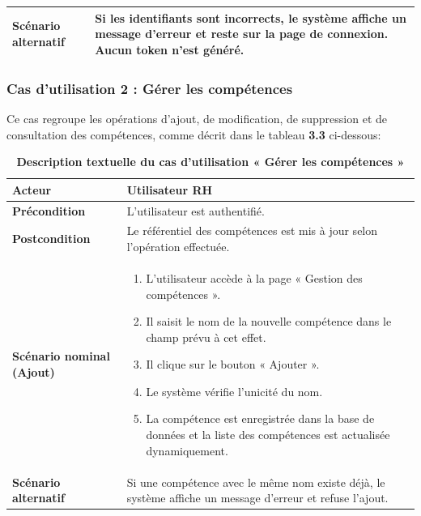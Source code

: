 \documentclass[12pt,a4paper,oneside]{report}
\begin{document}
\begin{itemize}
\begin{longtable}{|p{3.5cm}|p{11cm}|}
\textbf{Scénario alternatif} & 
Si les identifiants sont incorrects, le système affiche un message d'erreur et reste sur la page de connexion. Aucun token n'est généré. \\ \hline

\end{longtable}

\subsubsection*{Cas d'utilisation 2 : Gérer les compétences}

Ce cas regroupe les opérations d'ajout, de modification, de suppression et de consultation des compétences, comme décrit dans le tableau \textbf{3.3} ci-dessous:

\begin{longtable}{|p{3.5cm}|p{11cm}|}
\caption{\textbf{Description textuelle du cas d'utilisation « Gérer les compétences »}}
\label{tab:uc-skills}
\hline
\textbf{Acteur} & Utilisateur RH \\ \hline
\textbf{Précondition} & L'utilisateur est authentifié. \\ \hline
\textbf{Postcondition} & Le référentiel des compétences est mis à jour selon l'opération effectuée. \\ \hline

\textbf{Scénario nominal (Ajout)} & 
\begin{enumerate}[nosep, leftmargin=*, after=\vspace{-\baselineskip}, before=\vspace{0mm}]
    \item L'utilisateur accède à la page « Gestion des compétences ».
    \item Il saisit le nom de la nouvelle compétence dans le champ prévu à cet effet.
    \item Il clique sur le bouton « Ajouter ».
    \item Le système vérifie l'unicité du nom.
    \item La compétence est enregistrée dans la base de données et la liste des compétences est actualisée dynamiquement.
    \vspace{0.5cm}
\end{enumerate} \\ \hline

\textbf{Scénario alternatif} & 
Si une compétence avec le même nom existe déjà, le système affiche un message d'erreur et refuse l'ajout. \\ \hline


\end{longtable}
\end{itemize}
\end{document}

